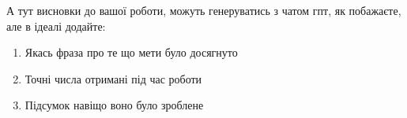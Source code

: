 
А тут висновки до вашої роботи, можуть генеруватись з чатом гпт, як побажаєте,
але в ідеалі додайте:
\begin{enumerate}
    \item Якась фраза про те що мети було досягнуто
    \item Точні числа отримані під час роботи
    \item Підсумок навіщо воно було зроблене
\end{enumerate}
